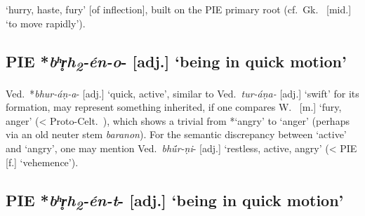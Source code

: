\documentclass[output=paper,colorlinks,citecolor=brown]{langscibook}
\begin{document}
 ‘hurry, haste, fury’ [of  inflection], built on the PIE primary root   (cf.\ Gk.\  [mid.] ‘to move rapidly’). 

\subsection{PIE *\textit{bʰr̥h\textsubscript{2}}\textit{-én-o}- [adj.] ‘being in quick motion’}
\label{sec:2.3}

Ved.\ *\textit{bhur-áṇ-a}-  [adj.] ‘quick, active’, similar to Ved.\ \textit{tur-áṇa-}  [adj.] ‘swift’ for its formation, may represent something inherited, if one compares W.\  [m.] ‘fury, anger’ (< Proto-Celt.\ ), which shows a trivial  from *‘angry’ to ‘anger’ (perhaps via an old neuter stem \*\textit{baranon}). For the semantic discrepancy between ‘active’ and ‘angry’, one may mention Ved.\ \textit{bhū́r-ṇi}-  [adj.] ‘restless, active, angry’ (< PIE  [f.] ‘vehemence’).

\subsection{PIE *\textit{bʰr̥h\textsubscript{2}}\textit{-én-t}- [adj.] ‘being in quick motion’}
\label{sec:2.4}
\end{document}
